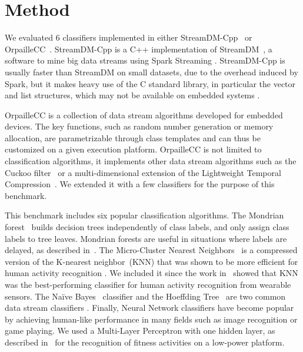\section{Method}
We evaluated 6 classifiers implemented in
either StreamDM-Cpp~\cite{StreamDM-CPP} or
OrpailleCC~\cite{OrpailleCC}.  StreamDM-Cpp is a
C++ implementation of StreamDM~\cite{StreamDM}, a
software to mine big data streams using Spark
Streaming . StreamDM-Cpp is usually faster than
StreamDM on small datasets, due to
the overhead induced by Spark, but it makes heavy
use of the C standard library, in particular the vector and
list structures, which may not be available on embedded systems
 .

OrpailleCC is a
collection of data stream algorithms developed for embedded devices. The key
functions, such as random number generation or memory allocation, are
parametrizable through class templates and can thus be customized 
on a given execution platform.
OrpailleCC is not limited to classification
algorithms, it implements other data stream
algorithms such as the Cuckoo filter~\cite{cuckoo}
or a multi-dimensional extension of the
Lightweight Temporal Compression~\cite{multi-ltc}. We extended it with 
a few classifiers for the purpose of this benchmark.

This benchmark includes six popular classification algorithms.  The Mondrian
forest~\cite{mondrian2014} builds decision trees independently of class labels,
and only assign class labels to tree leaves. Mondrian forests are useful in
situations where labels are delayed, as described
in~\cite{stream_learning_review}.  The Micro-Cluster Nearest
Neighbors~\cite{mc-nn} is a compressed version of the K-nearest
neighbor~(KNN) that was shown to be more efficient for human activity
recognition . We included
it since the work in~\cite{Janidarmian_2017} showed that KNN was the
best-performing classifier for human activity recognition from wearable
sensors.  The Naïve Bayes~\cite{naive_bayes} classifier
and the Hoeffding Tree~\cite{VFDT} are two common data stream classifiers .
Finally, Neural Network classifiers have
become popular by achieving human-like performance in many fields such as image
recognition or game playing. We used a
Multi-Layer Perceptron with one hidden layer, as described in~\cite{omid_2019} for the recognition 
of fitness activities on a low-power platform.


